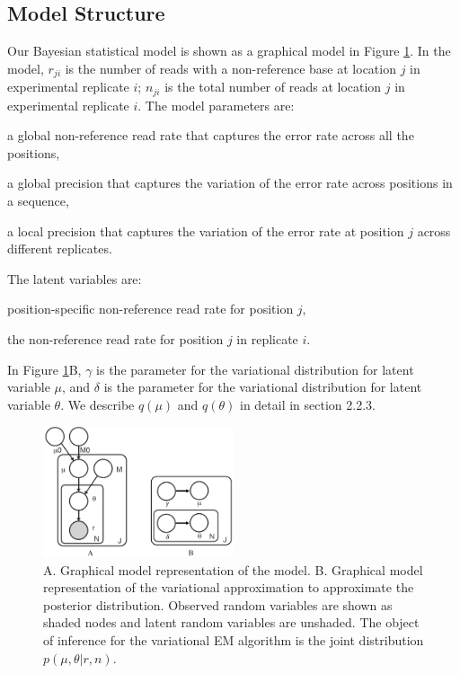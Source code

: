 \documentclass{bmcart}
\begin{document}
\subsection{Model Structure}
Our Bayesian statistical model is shown as a graphical model in Figure \ref{figure:model}.
In the model, $r_{ji}$ is the number of reads with a non-reference base at location $j$ in experimental replicate $i$; $n_{ji}$ is the total number of reads at location $j$ in experimental replicate $i$.
The model parameters are:
\begin{description}[noitemsep]
  \item[$\mu_0$] a global non-reference read rate that captures the error rate across all the positions,
  \item[$M_0$] a global precision that captures the variation of the error rate across positions in a sequence,
  \item[$M_j$] a local precision that captures the variation of the error rate at position $j$ across different replicates.
\end{description}
The latent variables are:
\begin{description}[noitemsep]
  \item[$\mu_j \sim \text{Beta}(\mu_0, M_0)$] position-specific non-reference read rate for position $j$,
  \item[$\theta_{ji} \sim \text{Beta}(\mu_j, M_j)$] the non-reference read rate for position $j$ in replicate $i$.
\end{description}

In Figure \ref{figure:model}B, $\gamma$ is the parameter for the variational distribution for latent variable $\mu$,
and $\delta$ is the parameter for the variational distribution for latent variable $\theta$.
We describe $q(\mu)$ and $q(\theta)$ in detail in section 2.2.3.

\begin{figure}[htpb]

\begin{center}
\includegraphics[width=0.5\textwidth]{rvd3.png}
\caption{ A. Graphical model representation of the model.
B. Graphical model representation of the variational approximation  to approximate the posterior distribution.
Observed random variables are shown as shaded nodes and latent random variables are unshaded.
The object of inference for the variational EM algorithm is the joint distribution $p(\mu, \theta|r, n)$.}
\label{figure:model}
\end{center}
\end{figure}
\end{document}

